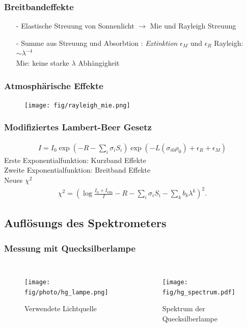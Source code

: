 \documentclass{beamer}
\begin{document}
\begin{frame}
    \frametitle{Breitbandeffekte}
    \begin{itemize}
        \item[-] Elastische Streuung von Sonnenlicht $\to$ Mie und Rayleigh Streuung
            \pause
        \item[-] Summe aus Streuung und Absorbtion : \textit{Extinktion} $\epsilon_M$ und $\epsilon_R$
            \pause
    Rayleigh: $\sim \lambda^{-4}$\\
    Mie: keine starke $\lambda$ Abhängigkeit
    \end{itemize}
\end{frame}

\begin{frame}
    \frametitle{Atmosphärische Effekte}
    \begin{figure}
    	\texttt{[image: fig/rayleigh\_mie.png]}
    \end{figure}
\end{frame}


\begin{frame}
    \frametitle{Modifiziertes Lambert-Beer Gesetz}
    \begin{align}
        I = I_0 \exp(-R - \sum_i \sigma_i S_i) \exp\left( -L (\sigma_{i0}\rho_0) + \epsilon_R + \epsilon_M\right)
    \end{align}
    Erste Exponentialfunktion: Kurzband Effekte\\
    Zweite Exponentialfunktion: Breitband Effekte\\
    \pause
    Neues $\chi^2$
    \begin{align}
        \chi^2 = \left( \log\frac{I_0 + I_\text{Ofs}}{I} - R - \sum_i \sigma_i S_i - \sum_k b_k \lambda^k \right)^2.
    \end{align}
\end{frame}

\begin{frame}
    \section{Auflösungs des Spektrometers}
    \frametitle{Messung mit Quecksilberlampe}
    \begin{columns}
    \begin{figure}
        \texttt{[image: fig/photo/hg\_lampe.png]}
        \caption{Verwendete Lichtquelle}
    \end{figure}
	\begin{figure}
        \texttt{[image: fig/hg\_spectrum.pdf]}
        \caption{Spektrum der Quecksilberlampe}
    \end{figure}
    \end{columns}
\end{frame}
\end{document}
